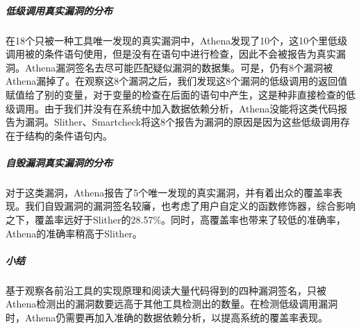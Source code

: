 \subparagraph{低级调用真实漏洞的分布}

在18个只被一种工具唯一发现的真实漏洞中，Athena发现了10个，这10个里低级调用被的条件语句使用，但是没有在语句中进行检查，因此不会被报告为真实漏洞。Athena漏洞签名去尽可能匹配疑似漏洞的数据集。可是，仍有8个漏洞被Athena漏掉了。在观察这8个漏洞之后，我们发现这8个漏洞的低级调用的返回值赋值给了别的变量，对于变量的检查在后面的语句中产生，这是种非直接检查的低级调用。由于我们并没有在系统中加入数据依赖分析，Athena没能将这类代码报告为漏洞。Slither、Smartcheck将这8个报告为漏洞的原因是因为这些低级调用存在于结构的条件语句内。

\subparagraph{自毁漏洞真实漏洞的分布}

对于这类漏洞，Athena报告了5个唯一发现的真实漏洞，并有着出众的覆盖率表现。我们自毁漏洞的漏洞签名较㢖，也考虑了用户自定义的函数修饰器，综合影响之下，覆盖率远好于Slither的28.57\%。同时，高覆盖率也带来了较低的准确率，Athena的准确率稍高于Slither。

\subparagraph{小结}

基于观察各前沿工具的实现原理和阅读大量代码得到的四种漏洞签名，只被Athena检测出的漏洞数要远高于其他工具检测出的数量。在检测低级调用漏洞时，Athena仍需要再加入准确的数据依赖分析，以提高系统的覆盖率表现。